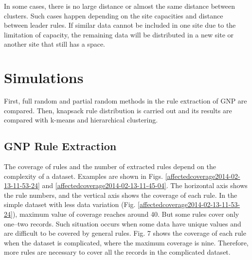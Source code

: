 \documentclass[fleqn,10pt,twocolumn]{SICE14}
\begin{document}
In some cases, there is no large distance or almost the same distance between clusters. Such cases happen depending on the site capacities and distance between leader rules. If similar data cannot be included in one site due to the limitation of capacity, the remaining data will be distributed in a new site or another site that still has a space.

\section{Simulations}
First, full random and partial random methods in the rule extraction of GNP are compared. Then, knapsack rule distribution is carried out and its results are compared with k-means and hierarchical clustering.

\subsection{GNP Rule Extraction}
The coverage of rules and the number of extracted rules depend on the complexity of a dataset. Examples are shown in Figs. \ref{affectedcoverage2014-02-13-11-53-24} and \ref{affectedcoverage2014-02-13-11-45-04}. The horizontal axis shows the rule numbers, and the vertical axis shows the coverage of each rule. In the simple dataset with less data variation (Fig. \ref{affectedcoverage2014-02-13-11-53-24}), maximum value of coverage reaches around 40. But some rules cover only one--two records. Such situation occurs when some data have unique values and are difficult to be covered by general rules. Fig. 7 shows the coverage of each rule when the dataset is complicated, where the maximum coverage is nine. Therefore, more rules are necessary to cover all the records in the complicated dataset.
\end{document}
